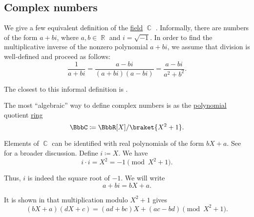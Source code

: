 \subsection{Complex numbers}\label{subsec:complex_numbers}

\begin{definition}\label{def:set_of_complex_numbers}
  We give a few equivalent definition of the \hyperref[def:field]{field} \( \BbbC \) . Informally, there are numbers of the form \( a + bi \), where \( a, b \in \BbbR \) and \( i = \sqrt{-1} \). In order to find the multiplicative inverse of the nonzero polynomial \( a + bi \), we assume that division is well-defined and proceed as follows:
  \begin{equation}\label{def:set_of_complex_numbers/inverse}
    \frac 1 {a + bi} = \frac {a - bi} {(a + bi)(a - bi)} = \frac{a - bi}{a^2 + b^2}.
  \end{equation}

  The closest to this informal definition is .

  \begin{thmenum}
     The most \enquote{algebraic} way to define complex numbers is as the \hyperref[def:polynomial_algebra]{polynomial} quotient \hyperref[thm:polynomial_quotient_rings_equinumerous_with_module_of_polynomials]{ring}
    \begin{equation*}
      \BbbC \coloneqq \BbbR[X] / \braket{X^2 + 1}.
    \end{equation*}

    Elements of \( \BbbC \) can be identified with real polynomials of the form \( bX + a \). See  for a broader discussion.
    Define \( i \coloneqq X \). We have
    \begin{equation*}
      i \cdot i = X^2 = -1 \pmod {X^2 + 1}.
    \end{equation*}

    Thus, \( i \) is indeed the square root of \( -1 \). We will write
    \begin{equation*}
      a + bi = bX + a.
    \end{equation*}

    It is shown in  that multiplication modulo \( X^2 + 1 \) gives
    \begin{equation}\label{def:set_of_complex_numbers/polynomials/multiplication}
      (bX + a) (dX + c) = (ad + bc)X + (ac - bd) \pmod {X^2 + 1}.
    \end{equation}


\end{thmenum}
\end{definition}
